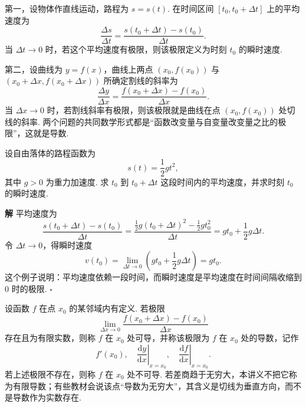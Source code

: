 \documentclass[fontset=fandol]{ctexart}
\newenvironment{solution}{\par\noindent\textbf{解}\quad}{\hfill$\square$\par\vspace{0.8em}}
\newcommand{\dd}{\mathrm{d}}
\begin{document}
第一，设物体作直线运动，路程为 $s=s(t)$. 在时间区间 $[t_0,t_0+\Delta t]$ 上的平均速度为
\[
\frac{\Delta s}{\Delta t}
=\frac{s(t_0+\Delta t)-s(t_0)}{\Delta t}.
\]
当 $\Delta t\to0$ 时，若这个平均速度有极限，则该极限定义为时刻 $t_0$ 的瞬时速度.

第二，设曲线为 $y=f(x)$，曲线上两点 $(x_0,f(x_0))$ 与 $(x_0+\Delta x,f(x_0+\Delta x))$ 所确定割线的斜率为
\[
\frac{\Delta y}{\Delta x}
=\frac{f(x_0+\Delta x)-f(x_0)}{\Delta x}.
\]
当 $\Delta x\to0$ 时，若割线斜率有极限，则该极限就是曲线在点 $(x_0,f(x_0))$ 处切线的斜率. 两个问题的共同数学形式都是“函数改变量与自变量改变量之比的极限”，这就是导数.

\begin{center}
\end{center}

\begin{example}[平均速度与瞬时速度]
设自由落体的路程函数为
\[
s(t)=\frac12gt^2,
\]
其中 $g>0$ 为重力加速度. 求 $t_0$ 到 $t_0+\Delta t$ 这段时间内的平均速度，并求时刻 $t_0$ 的瞬时速度.
\end{example}
\begin{solution}
平均速度为
\[
\frac{s(t_0+\Delta t)-s(t_0)}{\Delta t}
=\frac{\frac12g(t_0+\Delta t)^2-\frac12gt_0^2}{\Delta t}
=gt_0+\frac12g\Delta t.
\]
令 $\Delta t\to0$，得瞬时速度
\[
v(t_0)=\lim_{\Delta t\to0}\left(gt_0+\frac12g\Delta t\right)=gt_0.
\]
这个例子说明：平均速度依赖一段时间，而瞬时速度是平均速度在时间间隔收缩到 $0$ 时的极限.
\end{solution}

\begin{definition}[导数]
设函数 $f$ 在点 $x_0$ 的某邻域内有定义. 若极限
\[
\lim_{\Delta x\to0}\frac{f(x_0+\Delta x)-f(x_0)}{\Delta x}
\]
存在且为有限实数，则称 $f$ 在 $x_0$ 处可导，并称该极限为 $f$ 在 $x_0$ 处的导数，记作
\[
f'(x_0),\quad \left.\frac{\dd y}{\dd x}\right|_{x=x_0},\quad \left.\frac{\dd f}{\dd x}\right|_{x=x_0}.
\]
若上述极限不存在，则称 $f$ 在 $x_0$ 处不可导. 若差商趋于无穷大，本讲义不把它称为有限导数；有些教材会说该点“导数为无穷大”，其含义是切线为垂直方向，而不是导数作为实数存在.
\end{definition}
\end{document}
